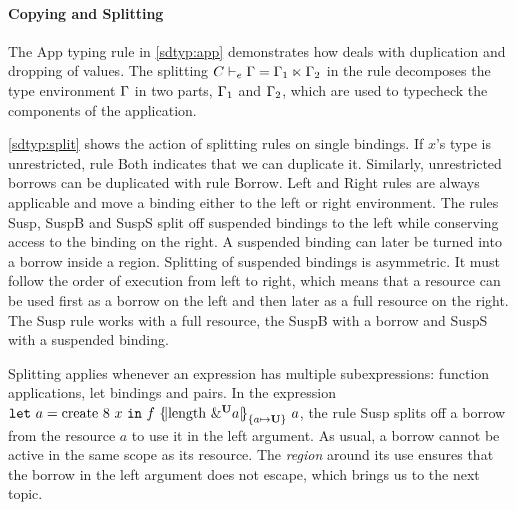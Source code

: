 \paragraph{Copying and Splitting}
\label{sdtyping:split}

The {\sc App} typing rule in \cref{sdtyp:app} demonstrates how \lang
deals with duplication and dropping of values.
The splitting $C \vdash_e \Gamma = \Gamma_1 \ltimes \Gamma_2$ in the rule decomposes the
type environment $\Gamma$ in two parts, $\Gamma_1$ and $\Gamma_2$, which are used
to typecheck the components of the application.

\cref{sdtyp:split} shows the action of splitting rules on single
bindings. If $x$'s type is unrestricted,
rule {\sc Both} indicates that we can duplicate it.
Similarly, unrestricted borrows can be duplicated with rule
{\sc Borrow}.
{\sc Left} and {\sc Right} rules are always applicable and move a binding
either to the left or right environment.
The rules {\sc Susp}, {\sc SuspB} and {\sc SuspS}
split off suspended bindings to
the left while conserving access to the binding on the right.
A suspended binding can later be turned
into a borrow inside a region. Splitting of suspended bindings is
asymmetric. It must follow the order of execution from left to right,
which means that a resource can be used first as a borrow on the left
and then later as a full resource on the right. The {\sc Susp} rule
works with a full resource, the {\sc SuspB}
with a borrow and {\sc SuspS} with a suspended binding.

Splitting applies whenever an
expression has multiple subexpressions:  function applications,
let bindings and pairs. In the
expression
$\letin{a}{\text{create}\ 8\ x}
{f\ \region[{}]{\Sone a\IBORROW}{\text{length}\ \borrow[\IBORROW]{a}}\ a}$,
the rule {\sc Susp} splits off a borrow from  the resource
$a$ to use it in the left argument.
As usual, a borrow cannot be active in the same scope as its resource.
The \emph{region} around its use ensures that the borrow in the left argument
does not
escape, which brings us to the next topic.




